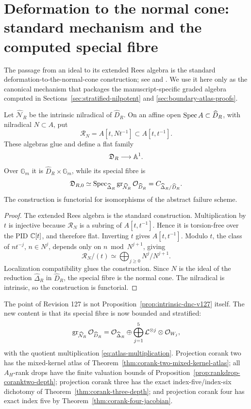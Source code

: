 \section{Deformation to the normal cone: standard mechanism and the computed special fibre}
\label{sec:rees-specialization-v127}

The passage from an ideal to its extended Rees algebra is the standard
deformation-to-the-normal-cone construction; see
\cite[\S5.1]{FultonIntersection} and
\cite[Tag 062Z]{StacksNormalCone}.  We use it here only as the
canonical mechanism that packages the manuscript-specific graded
algebra computed in Sections~\ref{sec:stratified-nilpotent} and
\ref{sec:boundary-atlas-proofs}.

\begin{proposition}
\label{prop:intrinsic-dnc-v127}
Let \(\widehat{\mathcal N}_R\) be the intrinsic nilradical of
\(\widehat D_R\).  On an affine open
\(\operatorname{Spec} A\subset\widehat D_R\), with nilradical \(N\subset A\), put
\[
 \mathscr R_N=A[t,Nt^{-1}]\subset A[t,t^{-1}].
\]
These algebras glue and define a flat family
\[
 \mathfrak D_R\longrightarrow\mathbb A^1.
\]
Over \(\mathbb G_m\) it is
\(\widehat D_R\times\mathbb G_m\), while its special fibre is
\[
 \mathfrak D_{R,0}
 \simeq
 \operatorname{Spec}_{\widehat\Delta_R}
 \operatorname{gr}_{\widehat{\mathcal N}_R}
 \mathcal O_{\widehat D_R}
 =
 C_{\widehat\Delta_R/\widehat D_R}.
\]
The construction is functorial for isomorphisms of the abstract
failure scheme.
\end{proposition}

\begin{proof}
The extended Rees algebra is the standard construction.  Multiplication
by \(t\) is injective because \(\mathscr R_N\) is a subring of
\(A[t,t^{-1}]\).  Hence it is torsion-free over the PID \(\mathbb C[t]\),
and therefore flat.  Inverting \(t\) gives
\(A[t,t^{-1}]\).  Modulo \(t\), the class of
\(n t^{-j}\), \(n\in N^j\), depends only on
\(n\bmod N^{j+1}\), giving
\[
 \mathscr R_N/(t)\simeq\bigoplus_{j\ge0}N^j/N^{j+1}.
\]
Localization compatibility glues the construction.  Since \(N\) is
the ideal of the reduction \(\widehat\Delta_R\) in
\(\widehat D_R\), the special fibre is the normal cone.  The
nilradical is intrinsic, so the construction is functorial.
\end{proof}

The point of Revision 127 is not Proposition~\ref{prop:intrinsic-dnc-v127}
itself.  The new content is that its special fibre is now bounded and
stratified:
\[
 \operatorname{gr}_{\widehat{\mathcal N}_R}\mathcal O_{\widehat D_R}
 =
 \mathcal O_{\widehat\Delta_R}
 \oplus
 \bigoplus_{j=1}^{5}
 \mathcal L^{\otimes j}\otimes\mathcal O_{W_j},
\]
with the quotient multiplication
\eqref{eq:atlas-multiplication}.  Projection corank two has the
mixed-kernel atlas of
Theorem~\ref{thm:corank-two-mixed-kernel-atlas}; all \(A_H\)-rank
drops have the finite valuation bounds of
Proposition~\ref{prop:rankdrop-coranktwo-depth}; projection corank
three has the exact index-five/index-six dichotomy of
Theorem~\ref{thm:corank-three-depth}; and projection corank four has
exact index five by
Theorem~\ref{thm:corank-four-jacobian}.

